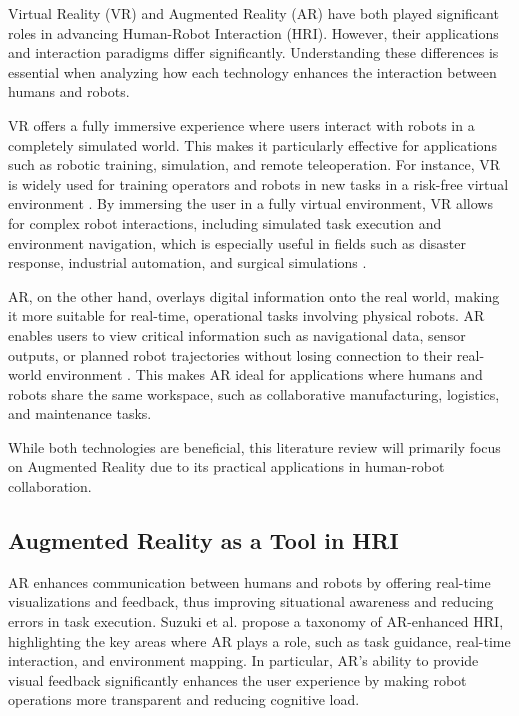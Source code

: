 Virtual Reality (VR) and Augmented Reality (AR) have both played significant roles in advancing Human-Robot Interaction (HRI). However, their applications and interaction paradigms differ significantly. Understanding these differences is essential when analyzing how each technology enhances the interaction between humans and robots.

VR offers a fully immersive experience where users interact with robots in a completely simulated world. This makes it particularly effective for applications such as robotic training, simulation, and remote teleoperation. For instance, VR is widely used for training operators and robots in new tasks in a risk-free virtual environment \cite{Coronado2023}. By immersing the user in a fully virtual environment, VR allows for complex robot interactions, including simulated task execution and environment navigation, which is especially useful in fields such as disaster response, industrial automation, and surgical simulations \cite{Gul2022}.

AR, on the other hand, overlays digital information onto the real world, making it more suitable for real-time, operational tasks involving physical robots. AR enables users to view critical information such as navigational data, sensor outputs, or planned robot trajectories without losing connection to their real-world environment \cite{García2019}. This makes AR ideal for applications where humans and robots share the same workspace, such as collaborative manufacturing, logistics, and maintenance tasks.

While both technologies are beneficial, this literature review will primarily focus on Augmented Reality due to its practical applications in human-robot collaboration. 

\subsection{Augmented Reality as a Tool in HRI}

AR enhances communication between humans and robots by offering real-time visualizations and feedback, thus improving situational awareness and reducing errors in task execution. Suzuki et al. \cite{Suzuki2022} propose a taxonomy of AR-enhanced HRI, highlighting the key areas where AR plays a role, such as task guidance, real-time interaction, and environment mapping. In particular, AR’s ability to provide visual feedback significantly enhances the user experience by making robot operations more transparent and reducing cognitive load.

